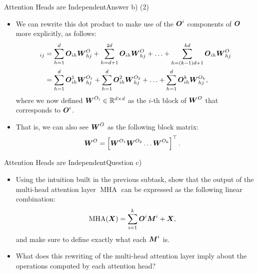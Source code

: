 \documentclass[t]{beamer}
\newcommand\op[1]{\operatorname{#1}}
\begin{document}
\begin{frame}{Attention Heads are Independent}{Answer b) (2)}
    \begin{itemize}
        \item We can rewrite this dot product to make use of the ${\boldsymbol{O}}^i$
              components of ${\boldsymbol{O}}$ more explicitly, as follows:
              {\small
              \begin{align}
                  [\mO\mW^O]_{ij} & = \sum_{h=1}^{d} \mO_{ih}\mW^O_{hj} + \sum_{h=d+1}^{2d} \mO_{ih}\mW^O_{hj} + \ldots + \sum_{h=(k-1)d+1}^{kd} \mO_{ih}\mW^O_{hj}         \\
                                  & = \sum_{h=1}^{d} \mO^1_{ih}\mW^{O_1}_{hj} + \sum_{h=1}^{d} \mO^2_{ih}\mW^{O_2}_{hj} + \ldots + \sum_{h=1}^{d} \mO^k_{ih}\mW^{O_k}_{hj},
              \end{align}
              }
              where we now defined ${\boldsymbol{W}}^{O_i}\in\mathbb{R}^{d\times d}$ as the
              $i$-th block of ${\boldsymbol{W}}^O$ that corresponds to ${\boldsymbol{O}}^i$.
        \item That is, we can also see ${\boldsymbol{W}}^O$ as the following block matrix:
              \begin{align}
                  {\boldsymbol{W}}^O & = \left[{\boldsymbol{W}}^{O_1} {\boldsymbol{W}}^{O_2} \ldots {\boldsymbol{W}}^{O_k}\right]^\top.
              \end{align}
    \end{itemize}
\end{frame}

\begin{frame}{Attention Heads are Independent}{Question c)}
    \begin{itemize}
        \item Using the intuition built in the previous subtask, show that the
              output of the multi-head attention layer $\op{MHA}$ can be
              expressed as the following linear combination:
              \begin{align}
                  \op{MHA}(\mX) & = \sum_{i=1}^{k} \mO^i\mM^i + \mX,
              \end{align}
              and make sure to define exactly what each ${\boldsymbol{M}}^i$ is.
        \item What does this rewriting of the multi-head attention layer imply
              about the operations computed by each attention head?
    \end{itemize}
\end{frame}
\end{document}
